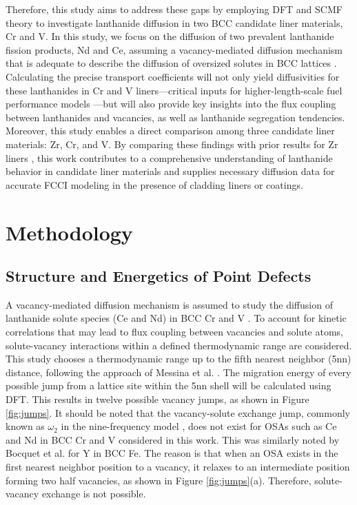 \documentclass[preprint,12pt]{elsarticle}
\providecommand{\DIFdelbegin}{\protect\color{red}} %
\newcommand{\DIFscaledelfig}{0.5}
\newlength{\DIFdelgraphicswidth} %
\newlength{\DIFdelgraphicsheight} %
\newcommand{\DIFdelincludegraphics}[2][]{%
\sbox{\DIFdelgraphicsbox}{\DIFOincludegraphics[#1]{#2}}%
\settoboxwidth{\DIFdelgraphicswidth}{\DIFdelgraphicsbox} %
\settoboxtotalheight{\DIFdelgraphicsheight}{\DIFdelgraphicsbox} %
\scalebox{\DIFscaledelfig}{%
\parbox[b]{\DIFdelgraphicswidth}{\usebox{\DIFdelgraphicsbox}\\[-\baselineskip] \rule{\DIFdelgraphicswidth}{0em}}\llap{\resizebox{\DIFdelgraphicswidth}{\DIFdelgraphicsheight}{%
\setlength{\unitlength}{\DIFdelgraphicswidth}%
\begin{picture}(1,1)%
\thicklines\linethickness{2pt} %
{\color[rgb]{1,0,0}\put(0,0){\framebox(1,1){}}}%
{\color[rgb]{1,0,0}\put(0,0){\line( 1,1){1}}}%
{\color[rgb]{1,0,0}\put(0,1){\line(1,-1){1}}}%
\end{picture}%
}\hspace*{3pt}}} %
} %
\DeclareRobustCommand{\DIFdelbegin}{\DIFOdelbegin \let\includegraphics\DIFdelincludegraphics} %
\begin{document}
Therefore, this study aims to address these gaps by employing DFT and SCMF theory to investigate lanthanide diffusion in two BCC candidate liner materials, Cr and V. In this study, we focus on the diffusion of two prevalent lanthanide fission products, Nd and Ce, assuming a vacancy-mediated diffusion mechanism that is adequate to describe the diffusion of oversized solutes in BCC lattices \cite{yang_significant_2023, bocquet_migration_2017}. Calculating the precise transport coefficients will not only yield diffusivities for these lanthanides in Cr and V liners—critical inputs for higher-length-scale fuel performance models \cite{HIRSCHHORN2025113811}—but will also provide key insights into the flux coupling between lanthanides and vacancies, as well as lanthanide segregation tendencies. Moreover, this study enables a direct comparison among three candidate liner materials: Zr, Cr, and V. By comparing these findings with prior results for Zr liners \cite{shousha2024first}, this work contributes to a comprehensive understanding of lanthanide behavior in candidate liner materials and supplies necessary diffusion data for accurate FCCI modeling in the presence of cladding liners or coatings.



\FloatBarrier
\section{Methodology}

\subsection{Structure and Energetics of Point Defects}
\label{sec:methods_energetics}
A vacancy-mediated diffusion mechanism is assumed to study the diffusion of lanthanide solute species (Ce and Nd) in BCC Cr and V \cite{yang_significant_2023, bocquet_migration_2017}. To account for kinetic correlations that may lead to flux coupling between vacancies and solute atoms, solute-vacancy interactions within a defined thermodynamic range are considered. This study chooses a thermodynamic range up to the fifth nearest neighbor (5nn) distance, following the approach of Messina et al. \cite{messina_exact_2014,MESSINA201328}. The migration energy of every possible jump from a lattice site within the 5nn shell will be calculated using DFT. This results in twelve possible vacancy jumps, as shown in Figure \ref{fig:jumps}. It should be noted that the vacancy-solute exchange jump, commonly known as $\omega_2$ in the nine-frequency model \cite{leclaire1970solvent}, does not exist for OSAs such as Ce and Nd in BCC Cr and V considered in this work. This was similarly noted by Bocquet et al. \cite{bocquet_migration_2017} for Y in BCC Fe. The reason is that when an OSA exists in the first nearest neighbor position to a vacancy, it relaxes to an intermediate position forming two half vacancies, as shown in Figure \ref{fig:jumps}(a). Therefore, solute-vacancy exchange is not possible.
\DIFdelbegin %
\end{document}
